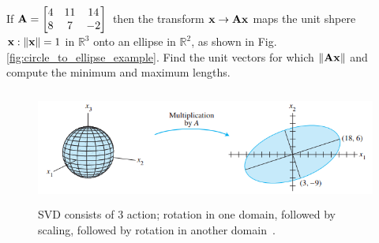 \documentclass[a4paper]{article}
\numberwithin{equation}{section} %
\newcounter{example}
\newcommand{\setR}{\mathbb{R}} %
\newcommand{\norm}[1] {\lVert #1 \rVert} %
\newcommand{\B}[1]{\textbf{\textup{#1}}} %
\begin{document}
\begin{exmp}
If $\B{A}=\begin{bmatrix}4 & 11 & 14\\8 & 7& -2 \end{bmatrix}$\ then the transform $\B{x}\rightarrow \B{Ax}$ maps the unit shpere $\B{x}: \norm{\B{x}}=1$ in $\setR^3$ onto an ellipse in $\setR^2$, as shown in Fig. \ref{fig:circle_to_ellipse_example}. Find the unit vectors for which $\norm{\B{Ax}}$ and compute the minimum and maximum lengths.
\begin{figure}[H]
	\centering %
	\includegraphics[height=3.75cm]{sphere_to_ell.PNG}
    \caption{SVD consists of 3 action; rotation in one domain, followed by scaling, followed by rotation in another domain~\cite{lay}.}
    \label{fig:svd_vis_01}
\end{figure}
\end{exmp}
\end{document}
